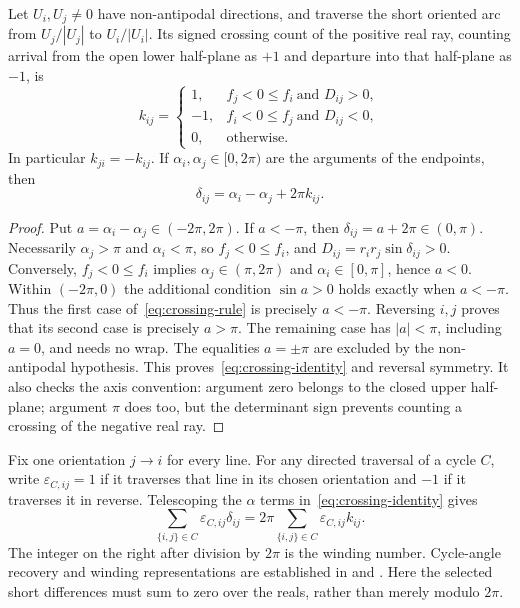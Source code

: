 \begin{lemma}
\label{lem:crossing}
Let $U_i,U_j\ne0$ have non-antipodal directions, and traverse the short
oriented arc from $U_j/|U_j|$ to $U_i/|U_i|$. Its signed crossing count of
the positive real ray, counting arrival from the open lower half-plane as
$+1$ and departure into that half-plane as $-1$, is
\begin{equation}
 k_{ij}=\begin{cases}
 1,& f_j<0\le f_i\ \text{and }D_{ij}>0,\\
 -1,& f_i<0\le f_j\ \text{and }D_{ij}<0,\\
 0,&\text{otherwise}.
 \end{cases}
 \label{eq:crossing-rule}
\end{equation}
In particular $k_{ji}=-k_{ij}$. If $\alpha_i,\alpha_j\in[0,2\pi)$ are the
arguments of the endpoints, then
\begin{equation}
 \delta_{ij}=\alpha_i-\alpha_j+2\pi k_{ij}.
 \label{eq:crossing-identity}
\end{equation}
\end{lemma}
\begin{proof}
Put $a=\alpha_i-\alpha_j\in(-2\pi,2\pi)$.
If $a< -\pi$, then $\delta_{ij}=a+2\pi\in(0,\pi)$.
Necessarily $\alpha_j>\pi$ and $\alpha_i<\pi$, so
$f_j<0\le f_i$, and $D_{ij}=r_ir_j\sin\delta_{ij}>0$.
Conversely, $f_j<0\le f_i$ implies $\alpha_j\in(\pi,2\pi)$ and
$\alpha_i\in[0,\pi]$, hence $a<0$. Within $(-2\pi,0)$ the additional
condition $\sin a>0$ holds exactly when $a< -\pi$.
Thus the first case of~\eqref{eq:crossing-rule} is precisely $a< -\pi$.
Reversing $i,j$ proves that its second case is precisely $a>\pi$.
The remaining case has $|a|<\pi$, including $a=0$, and needs no wrap.
The equalities $a=\pm\pi$ are excluded by the non-antipodal hypothesis.
This proves~\eqref{eq:crossing-identity} and reversal symmetry. It also
checks the axis convention: argument zero belongs to the closed upper
half-plane; argument $\pi$ does too, but the determinant sign prevents
counting a crossing of the negative real ray.
\end{proof}

Fix one orientation $j\to i$ for every line. For any directed traversal of
a cycle $C$, write $\varepsilon_{C,ij}=1$ if it traverses that line in its
chosen orientation and $-1$ if it traverses it in reverse. Telescoping the
$\alpha$ terms in~\eqref{eq:crossing-identity} gives
\begin{equation}
 \sum_{\{i,j\}\in C}\varepsilon_{C,ij}\delta_{ij}
 =2\pi\sum_{\{i,j\}\in C}\varepsilon_{C,ij}k_{ij}.
 \label{eq:cycle-winding}
\end{equation}
The integer on the right after division by $2\pi$ is the winding number.
Cycle-angle recovery and winding representations are established in
\citet[Theorem 2]{FarivarLow2013} and \citet{JafarpourEtAl2022}.
Here the selected short differences must sum to zero over the reals,
rather than merely modulo $2\pi$.

